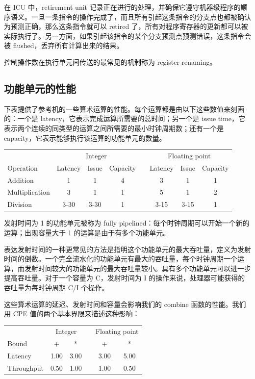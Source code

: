在 ICU 中，retirement unit 记录正在进行的处理，并确保它遵守机器级程序的顺序语义。一旦一条指令的操作完成了，而且所有引起这条指令的分支点也都被确认为预测正确，那么这条指令就可以 retired 了，所有对程序寄存器的更新都可以被实际执行了。另一方面，如果引起该指令的某个分支预测点预测错误，这条指令会被 flushed，丢弃所有计算出来的结果。

控制操作数在执行单元间传送的最常见的机制称为 register renaming。

\subsection{功能单元的性能}

下表提供了参考机的一些算术运算的性能。每个运算都是由以下这些数值来刻画的：一个是 latency，它表示完成运算所需要的总时间；另一个是 issue time，它表示两个连续的同类型的运算之间所需要的最小时钟周期数；还有一个是 capacity，它表示能够执行该运算的功能单元的数量。

\begin{table}[!ht]
    \centering
    \begin{tabular}{lccccccc}
        \toprule
        & \multicolumn{3}{c}{Integer} & & \multicolumn{3}{c}{Floating point} \\
        \cmidrule{2-4}
        \cmidrule{6-8}
        Operation & Latency & Issue & Capacity & & Latency & Issue & Capacity \\
        \midrule
        Addition & 1 & 1 & 4 & & 3 & 1 & 1 \\
        Multiplication & 3 & 1 & 1 & & 5 & 1 & 2 \\
        Division & 3-30 & 3-30 & 1 & & 3-15 & 3-15 & 1 \\
        \bottomrule
    \end{tabular}
\end{table}

发射时间为 1 的功能单元被称为 fully pipelined：每个时钟周期可以开始一个新的运算；出现容量大于 1 的运算是由于有多个功能单元。

表达发射时间的一种更常见的方法是指明这个功能单元的最大吞吐量，定义为发射时间的倒数。一个完全流水化的功能单元有最大的吞吐量，每个时钟周期一个运算，而发射时间较大的功能单元的最大吞吐量较小。具有多个功能单元可以进一步提高吞吐量。对于一个容量为 C，发射时间为 I 的操作来说，处理器可能获得的吞吐量为每时钟周期 C/I 个操作。

这些算术运算的延迟、发射时间和容量会影响我们的 combine 函数的性能。我们用 CPE 值的两个基本界限来描述这种影响：

\begin{table}[!ht]
    \centering
    \begin{tabular}{lccccc}
        \toprule
        & \multicolumn{2}{c}{Integer} & & \multicolumn{2}{c}{Floating point} \\
        \cmidrule{2-3} \cmidrule{5-6}
        Bound & + & * & & + & * \\
        \midrule
        Latency & 1.00 & 3.00 & & 3.00 & 5.00 \\
        Throughput & 0.50 & 1.00 & & 1.00 & 0.50 \\
        \bottomrule
    \end{tabular}
\end{table}
